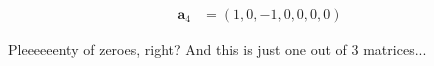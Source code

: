\documentclass{zkdl-presentation-template}
\begin{document}
\begin{frame}
\begin{center}
\begin{minipage}{0.4\textwidth}
{\begin{align*}
            \mathbf{a}_4 &= (1, 0, -1, 0, 0, 0, 0)
        \end{align*}}
        \end{minipage}
        \begin{minipage}{0.5\textwidth}
        \end{minipage}
        \end{center}
            
        \pause
        Pleeeeeenty of zeroes, right? And this is just one out of 3 matrices...
    \end{frame}
\end{document}
